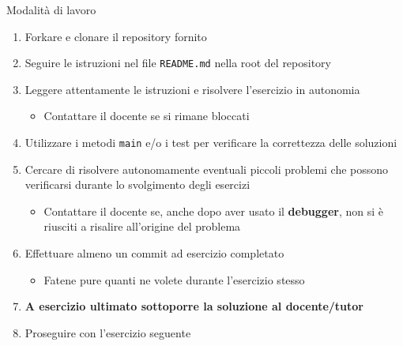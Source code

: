 \documentclass[xcolor=dvipsnames,presentation]{beamer}
\begin{document}
\begin{frame}{Modalità di lavoro}
	\begin{enumerate}
		\item Forkare e clonare il repository fornito
		\item Seguire le istruzioni nel file \texttt{README.md} nella root del repository
		\item Leggere attentamente le istruzioni e risolvere l'esercizio in autonomia
		\begin{itemize}
			\item Contattare il docente se si rimane bloccati
		\end{itemize}
		\item Utilizzare i metodi \texttt{main} e/o i test per verificare la correttezza delle soluzioni
		\item Cercare di risolvere autonomamente eventuali piccoli problemi che possono verificarsi durante lo svolgimento degli esercizi
		\begin{itemize}
			\item Contattare il docente se, anche dopo aver usato il \textbf{debugger}, non si è riusciti a risalire all'origine del problema
		\end{itemize}
		\item Effettuare almeno un commit ad esercizio completato
		\begin{itemize}
			\item Fatene pure quanti ne volete durante l'esercizio stesso
		\end{itemize}
		\item \textbf{A esercizio ultimato sottoporre la soluzione al docente/tutor}
		\item Proseguire con l'esercizio seguente
	\end{enumerate}
\end{frame}
\end{document}
